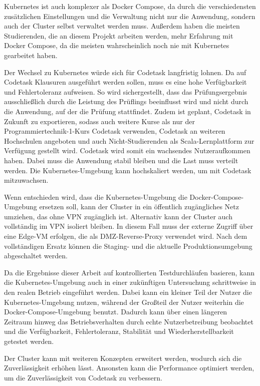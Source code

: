 Kubernetes ist auch komplexer als Docker Compose, da durch die verschiedensten zusätzlichen Einstellungen und die Verwaltung nicht nur die Anwendung, sondern auch der Cluster selbst verwaltet werden muss.
Außerdem haben die meisten Studierenden, die an diesem Projekt arbeiten werden, mehr Erfahrung mit Docker Compose, da die meisten wahrscheinlich noch nie mit Kubernetes gearbeitet haben.

Der Wechsel zu Kubernetes würde sich für Codetask langfristig lohnen. 
Da auf Codetask Klausuren ausgeführt werden sollen, muss es eine hohe Verfügbarkeit und Fehlertoleranz aufweisen. So wird sichergestellt, dass das Prüfungsergebnis ausschließlich durch die Leistung des Prüflings beeinflusst wird und nicht durch die Anwendung, auf der die Prüfung stattfindet.
Zudem ist geplant, Codetask in Zukunft zu exportieren, sodass auch weitere Kurse als nur der Programmiertechnik-1-Kurs Codetask verwenden, Codetask an weiteren Hochschulen angeboten und auch Nicht-Studierenden als Scala-Lernplattform zur Verfügung gestellt wird. 
Codetask wird somit ein wachsendes Nutzeraufkommen haben. Dabei muss die Anwendung stabil bleiben und die Last muss verteilt werden. 
Die Kubernetes-Umgebung kann hochskaliert werden, um mit Codetask mitzuwachsen.

Wenn entschieden wird, dass die Kubernetes-Umgebung die Docker-Compose-Umgebung ersetzen soll, kann der Cluster in ein öffentlich zugängliches Netz umziehen, das ohne VPN zugänglich ist.
Alternativ kann der Cluster auch vollständig im VPN isoliert bleiben. In diesem Fall muss der externe Zugriff über eine Edge-VM erfolgen, die als DMZ-Reverse-Proxy verwendet wird.
Nach dem vollständigen Ersatz können die Staging- und die aktuelle Produktionsumgebung abgeschaltet werden.

Da die Ergebnisse dieser Arbeit auf kontrollierten Testdurchläufen basieren, kann die Kubernetes-Umgebung auch in einer zukünftigen Untersuchung schrittweise in den realen Betrieb eingeführt werden.
Dabei kann ein kleiner Teil der Nutzer die Kubernetes-Umgebung nutzen, während der Großteil der Nutzer weiterhin die Docker-Compose-Umgebung benutzt.
Dadurch kann über einen längeren Zeitraum hinweg das Betriebsverhalten durch echte Nutzerbetreibung beobachtet und die Verfügbarkeit, Fehlertoleranz, Stabilität und Wiederherstellbarkeit getestet werden.

Der Cluster kann mit weiteren Konzepten erweitert werden, wodurch sich die Zuverlässigkeit erhöhen lässt.
Ansonsten kann die Performance optimiert werden, um die Zuverlässigkeit von Codetask zu verbessern.
